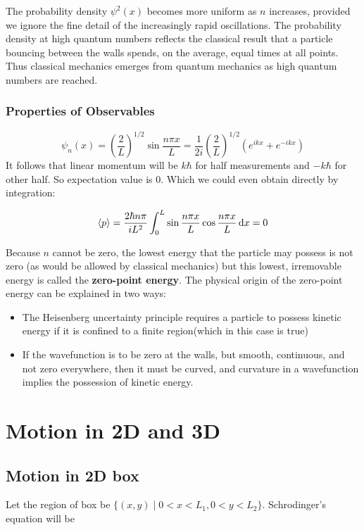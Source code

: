 \documentclass[11pt]{article}
\theoremstyle{definition}
\begin{document}
The probability density $\psi^2(x)$ becomes more uniform as $n$ increases, provided we ignore the fine detail of the increasingly rapid oscillations. The probability density at high quantum numbers reflects the classical result that a particle bouncing between the walls spends, on the average, equal times at all points. Thus classical mechanics emerges from quantum mechanics as high quantum numbers are reached.
\subsubsection{Properties of Observables}

$$\psi_n(x) = \left(\frac{2}{L}\right)^{1/2}\sin{\frac{n\pi x}{L}} = \frac{1}{2i}\left(\frac{2}{L}\right)^{1/2} (e^{ikx} + e^{-ikx})$$
It follows that linear momentum will be $k\hbar$ for half measurements and $-k\hbar$ for other half. So expectation value is 0. Which we could even obtain directly by integration:

\begin{equation*}
    \expval{p} =  \frac{2\hbar n \pi}{iL^2} \int_0 ^L \sin{\frac{n\pi x}{L}} \cos{\frac{n \pi x}{L}} \dd{x} = 0
\end{equation*}

Because $n$ cannot be zero, the lowest energy that the particle may possess is not zero (as would be allowed by classical mechanics) but this lowest, irremovable energy is called the \textbf{zero-point energy}. The physical origin of the zero-point energy can be explained in two ways:

\begin{itemize}
    \item The Heisenberg uncertainty principle requires a particle to possess kinetic energy if it is confined to a finite region(which in this case is true)
    \item If the wavefunction is to be zero at the walls, but smooth, continuous, and not zero everywhere, then it must be curved, and curvature in a wavefunction implies the possession of kinetic energy.
\end{itemize}
\section{Motion in 2D and 3D}
\subsection{Motion in 2D box}
Let the region of box be $\{(x,y) \mid 0<x<L_1, 0<y<L_2 \}$.
Schrodinger's equation will be 
\end{document}
